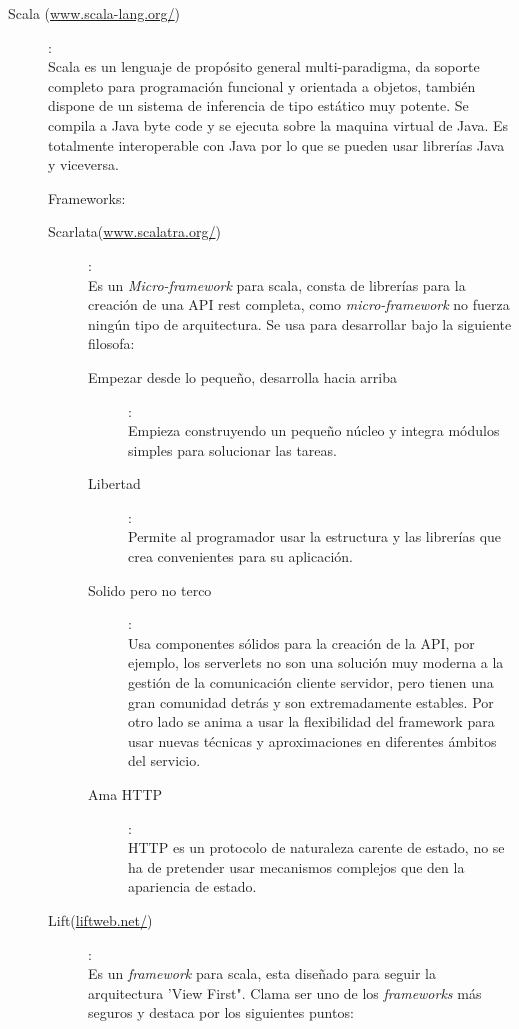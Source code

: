 \begin{description}
\item[Scala (\url{www.scala-lang.org/})]:
\\Scala es un lenguaje de propósito general multi-paradigma, da soporte completo para programación funcional y orientada a objetos, también dispone de un sistema de inferencia de tipo estático muy potente. Se compila a Java byte code y se ejecuta sobre la maquina virtual de Java. Es totalmente interoperable con Java por lo que se pueden usar librerías Java y viceversa.

Frameworks:

\begin{description}
\item[Scarlata(\url{www.scalatra.org/})]:
\\Es un \textit{Micro-framework} para scala, consta de librerías para la creación de una API rest completa, como \textit{micro-framework} no fuerza ningún tipo de arquitectura. Se usa para desarrollar bajo la siguiente filosofa:

\begin{description}
\item[Empezar desde lo pequeño, desarrolla hacia arriba]: \\Empieza construyendo un pequeño núcleo y integra módulos simples para solucionar las tareas.
\item[Libertad]: \\Permite al programador usar la estructura y las librerías que crea convenientes para su aplicación.
\item[Solido pero no terco]: \\Usa componentes sólidos para la creación de la API, por ejemplo, los serverlets no son una solución muy moderna a la gestión de la comunicación cliente servidor, pero tienen una gran comunidad detrás y son extremadamente estables. Por otro lado se anima a usar la flexibilidad del framework para usar nuevas técnicas y aproximaciones en diferentes ámbitos del servicio. 
\item[Ama HTTP]: \\HTTP es un protocolo de naturaleza carente de estado, no se ha de pretender usar mecanismos complejos que den la apariencia de estado.
\end{description}

\item[Lift(\url{liftweb.net/})]:
\\Es un \textit{framework} para scala, esta diseñado para seguir la arquitectura 'View First". Clama ser uno de los \textit{frameworks} más seguros y destaca por los siguientes puntos:


\end{description}
\end{description}
